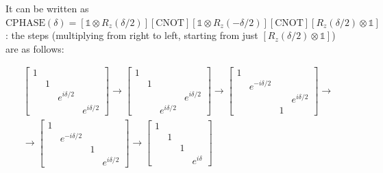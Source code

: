 \documentclass[main.tex]{subfiles}
\begin{document}
\begin{bluebox}
It can be written as \(\text{CPHASE} (\delta) = [\mathbb 1 \otimes R_z(\delta/2)] [\text{CNOT}] [\mathbb 1 \otimes R_z(-\delta/2)] [\text{CNOT}] [ R_z(\delta/2) \otimes\mathbb 1 ]\): the steps  (multiplying from right to left, starting from just \([ R_z(\delta/2) \otimes\mathbb 1 ]\)) are as follows:

\begin{multline}
    \begin{bmatrix}
    1   &   &   &  \\
       & 1  &   &  \\
       &   & e^{i \delta/2}  &  \\
       &   &   & e^{i \delta /2}
   \end{bmatrix}
\rightarrow
    \begin{bmatrix}
    1   &   &   &  \\
       & 1  &   &  \\
       &   &  & e^{i \delta/2}  \\
       &   &   e^{i \delta /2} &
   \end{bmatrix}
\rightarrow
    \begin{bmatrix}
    1   &   &   &  \\
       & e^{-i \delta/2}  &   &  \\
       &   &  & e^{i \delta/2}  \\
       &   &   1 &
   \end{bmatrix}
\rightarrow
\\
\rightarrow
    \begin{bmatrix}
    1   &   &   &  \\
       & e^{-i \delta/2}  &   &  \\
       &   &  1 &  \\
       &   &    & e^{i \delta/2}
   \end{bmatrix}
\rightarrow
    \begin{bmatrix}
    1   &   &   &  \\
       & 1  &   &  \\
       &   &  1 &  \\
       &   &    & e^{i \delta}
   \end{bmatrix}
\end{multline}
\end{bluebox}
\end{document}

